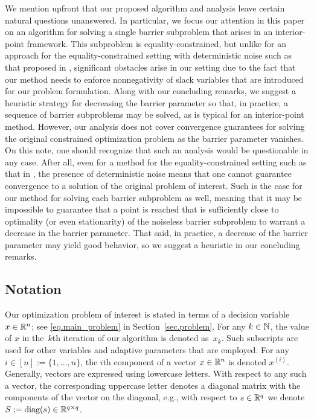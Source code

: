 We mention upfront that our proposed algorithm and analysis leave certain natural questions unanswered.  In particular, we focus our attention in this paper on an algorithm for solving a single barrier subproblem that arises in an interior-point framework.  This subproblem is equality-constrained, but unlike for an approach for the equality-constrained setting with deterministic noise such as that proposed in \cite{oztoprak2023constrained}, significant obstacles arise in our setting due to the fact that our method needs to enforce nonnegativity of slack variables that are introduced for our problem formulation.  Along with our concluding remarks, we suggest a heuristic strategy for decreasing the barrier parameter so that, in practice, a sequence of barrier subproblems may be solved, as is typical for an interior-point method.  However, our analysis does not cover convergence guarantees for solving the original constrained optimization problem as the barrier parameter vanishes.  On this note, one should recognize that such an analysis would be questionable in any case.  After all, even for a method for the equality-constrained setting such as that in \cite{oztoprak2023constrained}, the presence of deterministic noise means that one cannot guarantee convergence to a solution of the original problem of interest.  Such is the case for our method for solving each barrier subproblem as well, meaning that it may be impossible to guarantee that a point is reached that is sufficiently close to optimality (or even stationarity) of the noiseless barrier subproblem to warrant a decrease in the barrier parameter.  That said, in practice, a decrease of the barrier parameter may yield good behavior, so we suggest a heuristic in our concluding remarks.

\subsection{Notation}

Our optimization problem of interest is stated in terms of a decision variable $x \in \mathbb{R}^n$; see \eqref{eq.main_problem} in Section~\ref{sec.problem}.  For any $k \in \mathbb{N}$, the value of $x$ in the~$k$th iteration of our algorithm is denoted as~$x_k$.  Such subscripts are used for other variables and adaptive parameters that are employed.  For any $i \in [n] := \{1,\dots,n\}$, the $i$th component of a vector $x \in \mathbb{R}^n$ is denoted $x^{(i)}$.  Generally, vectors are expressed using lowercase letters.  With respect to any such a vector, the corresponding uppercase letter denotes a diagonal matrix with the components of the vector on the diagonal, e.g., with respect to $s \in \mathbb{R}^q$ we denote $S := \text{diag}(s) \in \mathbb{R}^{q \times q}$.

